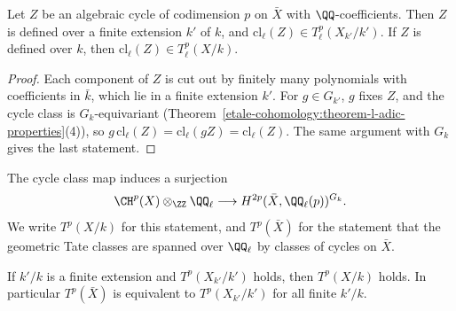\begin{lemma}\label{absolute-hodge:lemma-cycles-tate}
Let $Z$ be an algebraic cycle of codimension $p$ on $\bar X$ with $\QQ$-coefficients. Then $Z$ is defined over a finite extension $k'$ of $k$, and $\mathrm{cl}_\ell(Z) \in T^p_\ell(X_{k'}/k')$. If $Z$ is defined
over $k$, then $\mathrm{cl}_\ell(Z) \in T^p_\ell(X/k)$.
\end{lemma}

\begin{proof}
Each component of $Z$ is cut out by finitely many polynomials with coefficients in $\bar k$, which lie in a finite extension $k'$. For $g \in G_{k'}$, $g$ fixes $Z$, and the cycle class is $G_k$-equivariant
(Theorem~\ref{etale-cohomology:theorem-l-adic-properties}(4)), so $g\,\mathrm{cl}_\ell(Z) = \mathrm{cl}_\ell(gZ) = \mathrm{cl}_\ell(Z)$. The same argument with $G_k$ gives the last statement.
\end{proof}

\begin{conjecture}[Tate]\label{absolute-hodge:conjecture-tate}
The cycle class map induces a surjection
\[
\CH^p(X) \otimes_\ZZ\QQ_\ell \longrightarrow H^{2p}(\bar X, \QQ_\ell(p))^{G_k}.
\]
We write $T^p(X/k)$ for this statement, and $T^p(\bar X)$ for the statement that the geometric Tate classes are spanned over $\QQ_\ell$ by classes of cycles on $\bar X$.
\end{conjecture}

\begin{lemma}\label{absolute-hodge:lemma-descent}
If $k'/k$ is a finite extension and $T^p(X_{k'}/k')$ holds, then $T^p(X/k)$ holds. In particular $T^p(\bar X)$ is equivalent to $T^p(X_{k'}/k')$ for all finite $k'/k$.
\end{lemma}

